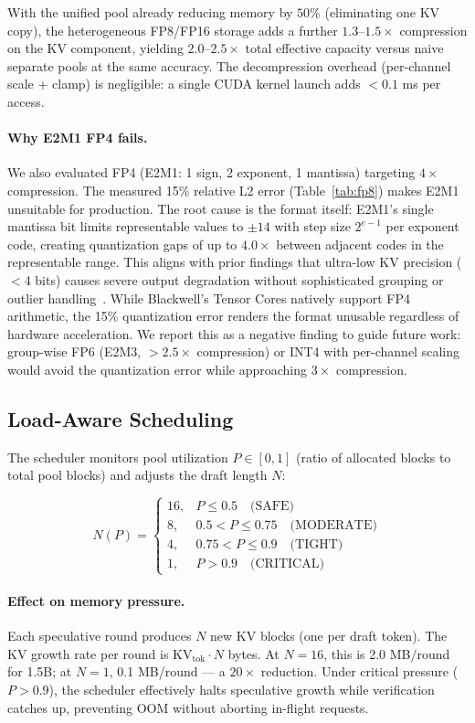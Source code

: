 \documentclass[review]{elsarticle}
\theoremstyle{definition}
\theoremstyle{remark}
\begin{document}
With the unified pool already reducing memory by $50\%$ (eliminating one
KV copy), the heterogeneous FP8/FP16 storage adds a further $1.3$--$1.5\times$
compression on the KV component, yielding $2.0$--$2.5\times$ total effective
capacity versus naive separate pools at the same accuracy. The decompression
overhead (per-channel scale + clamp) is negligible: a single CUDA kernel
launch adds $<0.1$ ms per access.

\paragraph{Why E2M1 FP4 fails.}
We also evaluated FP4 (E2M1: 1 sign, 2 exponent, 1 mantissa) targeting
$4\times$ compression. The measured 15\% relative L2 error (Table~\ref{tab:fp8})
makes E2M1 unsuitable for production. The root cause is the format itself:
E2M1's single mantissa bit limits representable values to $\pm 14$ with
step size $2^{e-1}$ per exponent code, creating quantization gaps of up
to $4.0\times$ between adjacent codes in the representable range.
This aligns with prior findings that ultra-low KV precision ($<$4 bits)
causes severe output degradation without sophisticated grouping or
outlier handling~\cite{kvquant2024}. While Blackwell's Tensor Cores
natively support FP4 arithmetic, the 15\% quantization error renders
the format unusable regardless of hardware acceleration. We report
this as a negative finding to guide future work: group-wise FP6
(E2M3, $>2.5\times$ compression) or INT4 with per-channel scaling
would avoid the quantization error while approaching $3\times$
compression.

\subsection{Load-Aware Scheduling}
\label{sec:scheduler}

The scheduler monitors pool utilization $P \in [0, 1]$ (ratio of allocated
blocks to total pool blocks) and adjusts the draft length $N$:

\[
N(P) = \begin{cases}
16, & P \leq 0.5 \quad \text{(SAFE)} \\
8,  & 0.5 < P \leq 0.75 \quad \text{(MODERATE)} \\
4,  & 0.75 < P \leq 0.9 \quad \text{(TIGHT)} \\
1,  & P > 0.9 \quad \text{(CRITICAL)}
\end{cases}
\]

\paragraph{Effect on memory pressure.}
Each speculative round produces $N$ new KV blocks (one per draft token).
The KV growth rate per round is $\text{KV}_\text{tok} \cdot N$ bytes.
At $N=16$, this is 2.0 MB/round for 1.5B; at $N=1$, 0.1 MB/round ---
a $20\times$ reduction. Under critical pressure ($P > 0.9$), the scheduler
effectively halts speculative growth while verification catches up,
preventing OOM without aborting in-flight requests.
\end{document}
